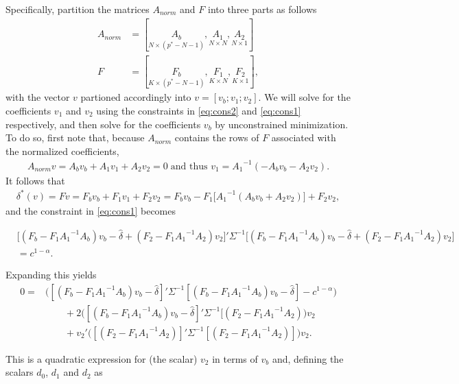 \documentclass[bib]{./sty/statapress}
\begin{document}
Specifically, partition the matrices $A_{norm}$ and $F$ into three parts as follows
\begin{align*}
A_{norm} &= [ \underset{N \times (p^* - N - 1)}{A_b}, \underset{N \times N}{A_1}, \underset{N \times 1}{A_2}] \\
F &= [\underset{K \times  (p^* - N -1) }{F_b},\underset{K \times N }{F_1},\underset{K \times 1}{F_2}],
\end{align*}
with the vector $v$ partioned accordingly into $v=[v_b; v_1; v_2]$.
We will solve for the coefficients $v_1$ and $v_2$ using the constraints in \eqref{eq:cons2} and \eqref{eq:cons1} respectively, and then solve for the coefficients $v_b$ by unconstrained minimization. To do so, first note that, because $A_{norm}$ contains the rows of $F$ associated with the normalized coefficients,
\begin{align}
A_{norm}v =  A_b v_b + A_1 v_1 + A_2 v_2 = 0 \;\text{and thus }v_1 = {A_1}^{-1}(- A_b v_b - A_2 v_2).\label{eq:def_v1}
\end{align}
It follows that
\begin{align*}
\delta^*(v)= Fv = F_b v_b + F_1 v_1 + F_2 v_2 = F_b v_b - F_1 \big[ {A_1}^{-1}( A_b v_b + A_2 v_2)\big] + F_2 v_2,
\end{align*}
and the constraint in \eqref{eq:cons1} becomes

\begin{align*}
&\bigg[(F_b - F_1 {A_1}^{-1}A_b) v_b - \hat{\delta} + (F_2 - F_1 {A_1}^{-1} A_2) v_2 \bigg]' \Sigma ^ {-1}\bigg[(F_b - F_1 {A_1}^{-1} A_b) v_b - \hat{\delta} + (F_2 - F_1 {A_1}^{-1}A_2) v_2  \bigg] \\\nonumber
&= c^{1 - \alpha}.
\end{align*}

Expanding this yields
\begin{align*}
0 = &\bigg([(F_b - F_1 {A_1}^{-1}A_b) v_b - \hat{\delta}]' \Sigma ^ {-1} [(F_b - F_1 {A_1}^{-1}A_b) v_b - \hat{\delta}] - c^{1 - \alpha} \bigg) \\
&\qquad + 2 \bigg([(F_b - F_1 {A_1}^{-1}A_b) v_b - \hat{\delta}]' \Sigma ^ {-1} [(F_2 - F_1 {A_1}^{-1} A_2) \bigg) v_2 \nonumber \\
&\qquad +  v_2'\bigg([(F_2 - F_1 {A_1}^{-1} A_2)]'\Sigma ^ {-1} [(F_2 - F_1 {A_1}^{-1}A_2)] \bigg)v_2 .
\end{align*}

This is a quadratic expression for (the scalar) $v_2$ in terms of $v_b$ and, defining the scalars $d_0$, $d_1$ and $d_2$ as
\end{document}
